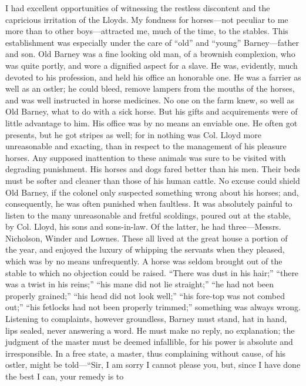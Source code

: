 I had excellent opportunities of witnessing the restless discontent and
the capricious irritation of the Lloyds. My fondness for horses---not
peculiar to me more than to other boys---attracted me, much of the time,
to the stables. This establishment was especially under the care of
``old'' and ``young'' Barney---father and son. Old Barney was a fine
looking old man, of a brownish complexion, who was quite portly, and
wore a dignified aspect for a slave. He was, evidently, much devoted to
his profession, and held his office an honorable one. He was a farrier
as well as an ostler; he could bleed, remove lampers from the mouths of
the horses, and was well instructed in horse medicines. No one on the
farm knew, so well as Old Barney, what to do with a sick horse. But his
gifts and acquirements were of little advantage to him. His office was
by no means an enviable one. He often got presents, but he got stripes
as well; for in nothing was Col. Lloyd more unreasonable and exacting,
than in respect to the management of his pleasure horses. Any supposed
inattention to these animals was sure to be visited with degrading
punishment. His horses and dogs fared better than his men. Their beds
must be softer and cleaner than those of his human cattle. No excuse
could shield {}Old Barney, if the colonel only suspected something wrong
about his horses; and, consequently, he was often punished when
faultless. It was absolutely painful to listen to the many unreasonable
and fretful scoldings, poured out at the stable, by Col. Lloyd, his sons
and sons-in-law. Of the latter, he had three---Messrs. Nicholson, Winder
and Lownes. These all lived at the great house a portion of the year,
and enjoyed the luxury of whipping the servants when they pleased, which
was by no means unfrequently. A horse was seldom brought out of the
stable to which no objection could be raised. ``There was dust in his
hair;'' ``there was a twist in his reins;'' ``his mane did not lie
straight;'' ``he had not been properly grained;'' ``his head did not
look well;'' ``his fore-top was not combed out;'' ``his fetlocks had not
been properly trimmed;'' something was always wrong. Listening to
complaints, however groundless, Barney must stand, hat in hand, lips
sealed, never answering a word. He must make no reply, no explanation;
the judgment of the master must be deemed infallible, for his power is
absolute and irresponsible. In a free state, a master, thus complaining
without cause, of his ostler, might be told---``Sir, I am sorry I cannot
please you, but, since I have done the best I can, your remedy is to
